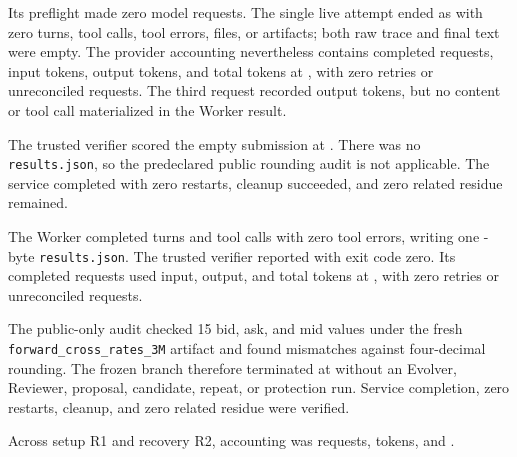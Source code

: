  Its preflight made zero model requests. The single live
attempt ended as \FXHZeroROneOutcome{} with zero turns, tool calls, tool errors,
files, or artifacts; both raw trace and final text were empty. The provider
accounting nevertheless contains \FXHZeroROneRequests{} completed requests,
\FXHZeroROneInputTokens{} input tokens, \FXHZeroROneOutputTokens{} output
tokens, and \FXHZeroROneTotalTokens{} total tokens at \FXHZeroROneCost{}, with
zero retries or unreconciled requests. The third request recorded
\FXHZeroROneThirdOutputTokens{} output tokens, but no content or tool call
materialized in the Worker result.

The trusted verifier scored the empty submission at \FXHZeroROneOfficial{}.
There was no \texttt{results.json}, so the predeclared public rounding audit is
not applicable. The service completed with zero restarts, cleanup succeeded,
and zero related residue remained. 

 The Worker completed \FXHZeroRTwoTurns{} turns and
\FXHZeroRTwoToolCalls{} tool calls with zero tool errors, writing one
\FXHZeroRTwoArtifactBytes{}-byte \texttt{results.json}. The trusted verifier
reported \FXHZeroRTwoOfficial{} with exit code zero. Its
\FXHZeroRTwoRequests{} completed requests used \FXHZeroRTwoInputTokens{} input,
\FXHZeroRTwoOutputTokens{} output, and \FXHZeroRTwoTotalTokens{} total tokens
at \FXHZeroRTwoCost{}, with zero retries or unreconciled requests.

The public-only audit checked 15 bid, ask, and mid values under the fresh
\texttt{forward\_cross\_rates\_3M} artifact and found
\FXHZeroRTwoRoundingMismatch{} mismatches against four-decimal rounding. The
frozen branch therefore terminated at \FXHZeroRTwoDecision{} without an
Evolver, Reviewer, proposal, candidate, repeat, or protection run. Service
completion, zero restarts, cleanup, and zero related residue were verified.

Across setup R1 and recovery R2, accounting was \FXHZeroCombinedRequests{}
requests, \FXHZeroCombinedTokens{} tokens, and \FXHZeroCombinedCost{}.

